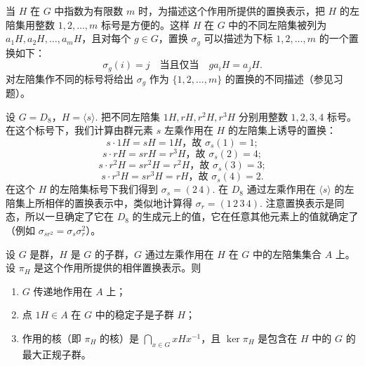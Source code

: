 当 \(H\) 在 \(G\) 中指数为有限数 \(m\) 时，为描述这个作用所提供的置换表示，把 \(H\) 的左陪集用整数 \(1, 2, \ldots, m\) 标号是方便的。这样 \(H\) 在 \(G\) 中的不同左陪集被列为 \(a_1H, a_2H, \ldots, a_mH\)，且对每个 \(g \in G\)，置换 \(\sigma_g\) 可以描述为下标 \(1, 2, \ldots, m\) 的一个置换如下：
\[
\sigma_g(i) = j \quad \text{当且仅当} \quad g a_i H = a_j H.
\]
对左陪集作不同的标号将给出 \(\sigma_g\) 作为 \(\{1, 2, \ldots, m\}\) 的置换的不同描述（参见习题）。

\begin{example}
设 \(G = D_8\)，\(H = \langle s \rangle\). 把不同左陪集 \(1H, rH, r^2H, r^3H\) 分别用整数 \(1, 2, 3, 4\) 标号。在这个标号下，我们计算由群元素 \(s\) 左乘作用在 \(H\) 的左陪集上诱导的置换：
\[
s \cdot 1H = sH = 1H \text{，故 } \sigma_s(1) = 1;
\]
\[
s \cdot rH = srH = r^3H \text{，故 } \sigma_s(2) = 4;
\]
\[
s \cdot r^2H = sr^2H = r^2H \text{，故 } \sigma_s(3) = 3;
\]
\[
s \cdot r^3H = sr^3H = rH \text{，故 } \sigma_s(4) = 2.
\]
在这个 \(H\) 的左陪集标号下我们得到 \(\sigma_s = (2\,4)\). 在 \(D_8\) 通过左乘作用在 \(\langle s \rangle\) 的左陪集上所相伴的置换表示中，类似地计算得 \(\sigma_r = (1\,2\,3\,4)\). 注意置换表示是同态，所以一旦确定了它在 \(D_8\) 的生成元上的值，它在任意其他元素上的值就确定了（例如 \(\sigma_{sr^2} = \sigma_s\sigma_r^2\)）。
\end{example}

\begin{theorem}\label{thm:4.3}
设 \(G\) 是群，\(H\) 是 \(G\) 的子群，\(G\) 通过左乘作用在 \(H\) 在 \(G\) 中的左陪集集合 \(A\) 上。设 \(\pi_H\) 是这个作用所提供的相伴置换表示。则

\begin{enumerate}[label=(\arabic*)]
\item \(G\) 传递地作用在 \(A\) 上；
\item 点 \(1H \in A\) 在 \(G\) 中的稳定子是子群 \(H\)；
\item 作用的核（即 \(\pi_H\) 的核）是 \(\bigcap_{x \in G} xHx^{-1}\)，且 \(\ker \pi_H\) 是包含在 \(H\) 中的 \(G\) 的最大正规子群。
\end{enumerate}
\end{theorem}

